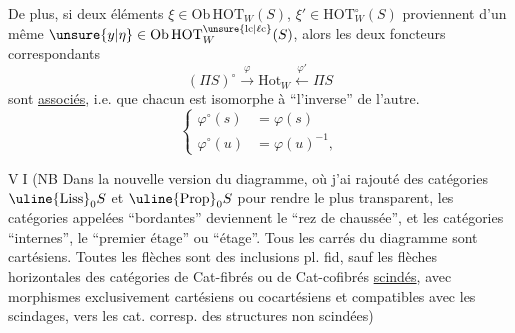 De plus, si deux éléments $\xi\in\mathrm{Ob}\,\mathrm{HOT}_W(S)$, $\xi'\in\mathrm{HOT}^\circ_W(S)$ proviennent d'un même $\unsure{y|\eta}\in\mathrm{Ob}\,\mathrm{HOT}^{\unsure{\mathrm{lc}|\ell\mathrm{c}}}_W(S)$, alors les deux foncteurs  correspondants
\[
 (\Pi S)^\circ\xrightarrow{\varphi}\mathrm{Hot}_W\xleftarrow{\varphi'}\Pi S
\]
sont \uline{associés}, i.e.  que chacun est isomorphe à ``l'inverse'' de l'autre.
\[
 \left\{\begin{aligned}
 \varphi^\circ(s)&=\varphi(s)\\
 \varphi^\circ(u)&=\varphi(u)^{-1},
 \end{aligned}\right.
\]

\textcircled{VI} (NB Dans la nouvelle version du diagramme, où j'ai rajouté des catégories $\text{\uline{Liss}}_0 S$ et $\text{\uline{Prop}}_0 S$ pour rendre le  plus transparent, les catégories appelées ``bordantes'' deviennent le ``rez de chaussée'', et les catégories ``internes'', le ``premier étage'' ou ``étage''. Tous les  carrés du diagramme sont cartésiens. Toutes les flèches sont des inclusions pl. fid, sauf les  flèches horizontales  des catégories de Cat-fibrés ou de Cat-cofibrés \uline{scindés}, avec morphismes exclusivement cartésiens ou cocartésiens et  compatibles avec les scindages, vers les cat. corresp.  des structures non scindées)

